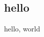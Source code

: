 \documentclass[a4paper]{report}
\begin{document}
\subsection{hello}
hello, world\\
\rule{0pt}{10ex}
\blindtext
\end{document}
